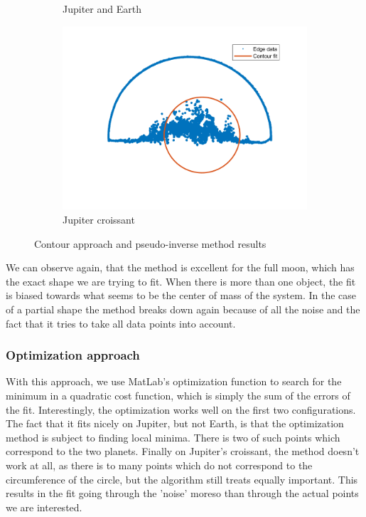 \begin{figure}[!ht]
\begin{subfigure}{0.32\textwidth}
        \caption{Jupiter and Earth}
    \end{subfigure}
    \begin{subfigure}{0.32\textwidth}
        \centering
        \includegraphics[width=\textwidth]{Doc/Graphics/Part3/contourDection_pseudoInverse_jupiter_partial.png}
        \caption{Jupiter croissant}
    \end{subfigure}
    \caption{Contour approach and pseudo-inverse method results}
    \label{fig:enter-label}
\end{figure}

We can observe again, that the method is excellent for the full moon, which has the exact shape we are trying to fit. When there is more than one object, the fit is biased towards what seems to be the center of mass of the system. In the case of a partial shape the method breaks down again because of all the noise and the fact that it tries to take all data points into account.

\subsubsection{Optimization approach}

With this approach, we use MatLab's optimization function to search for the minimum in a quadratic cost function, which is simply the sum of the errors of the fit. Interestingly, the optimization works well on the first two configurations. The fact that it fits nicely on Jupiter, but not Earth, is that the optimization method is subject to finding local minima. There is two of such points which correspond to the two planets. Finally on Jupiter's croissant, the method doesn't work at all, as there is to many points which do not correspond to the circumference of the circle, but the algorithm still treats equally important. This results in the fit going through the 'noise' moreso than through the actual points we are interested.

